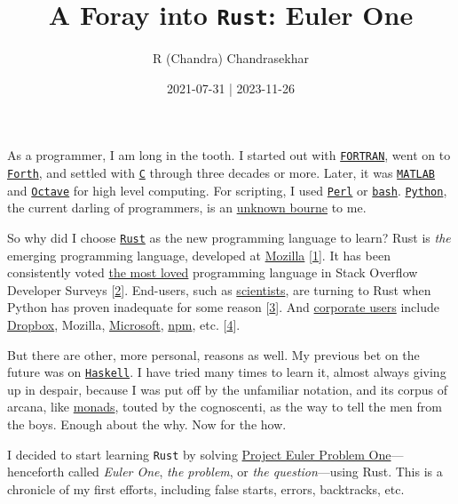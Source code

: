 \documentclass[
  a4paper,
]{article}
\title{A Foray into \texttt{Rust}: Euler One}
\author{R (Chandra) Chandrasekhar}
\date{2021-07-31 | 2023-11-26}
\begin{document}
\maketitle

\thispagestyle{empty}


As a programmer, I am long in the tooth. I started out with
\href{https://fortran-lang.org/}{\texttt{FORTRAN}}, went on to
\href{https://www.forth.com/}{\texttt{Forth}}, and settled with
\href{https://www.iso.org/standard/74528.html}{\texttt{C}} through three
decades or more. Later, it was
\href{https://www.mathworks.com/}{\texttt{MATLAB}} and
\href{https://www.gnu.org/software/octave/index}{\texttt{Octave}} for
high level computing. For scripting, I used
\href{https://www.perl.org/}{\texttt{Perl}} or
\href{https://www.gnu.org/software/bash/}{\texttt{bash}}.
\href{https://www.python.org/}{\texttt{Python}}, the current darling of
programmers, is an
\href{http://www.finedictionary.com/bourn.html}{unknown bourne} to me.

So why did I choose \href{https://www.rust-lang.org/}{\texttt{Rust}} as
the new programming language to learn? Rust is \emph{the} emerging
programming language, developed at
\href{https://research.mozilla.org/rust/}{Mozilla}
{[}\protect\hyperlink{ref-rust}{1}{]}. It has been consistently voted
\href{https://insights.stackoverflow.com/survey/2020\#most-loved-dreaded-and-wanted}{the
most loved} programming language in Stack Overflow Developer Surveys
{[}\protect\hyperlink{ref-goulding2020}{2}{]}. End-users, such as
\href{https://www.nature.com/articles/d41586-020-03382-2}{scientists},
are turning to Rust when Python has proven inadequate for some reason
{[}\protect\hyperlink{ref-perkel2020}{3}{]}. And
\href{https://serokell.io/blog/rust-companies}{corporate users} include
\href{https://www.dropbox.com/}{Dropbox}, Mozilla,
\href{https://www.youtube.com/watch?v=NQBVUjdkLAA}{Microsoft},
\href{https://www.npmjs.com/}{npm}, etc.
{[}\protect\hyperlink{ref-dreimanis2020}{4}{]}.

But there are other, more personal, reasons as well. My previous bet on
the future was on \href{https://www.haskell.org/}{\texttt{Haskell}}. I
have tried many times to learn it, almost always giving up in despair,
because I was put off by the unfamiliar notation, and its corpus of
arcana, like
\href{en.wikipedia.org/wiki/Monad_(functional_programming)}{monads},
touted by the cognoscenti, as the way to tell the men from the boys.
Enough about the why. Now for the how.

I decided to start learning \texttt{Rust} by solving
\href{https://projecteuler.net/problem=1}{Project Euler Problem
One}---henceforth called \emph{Euler One}, \emph{the problem}, or
\emph{the question}---using Rust. This is a chronicle of my first
efforts, including false starts, errors, backtracks, etc.
\end{document}
